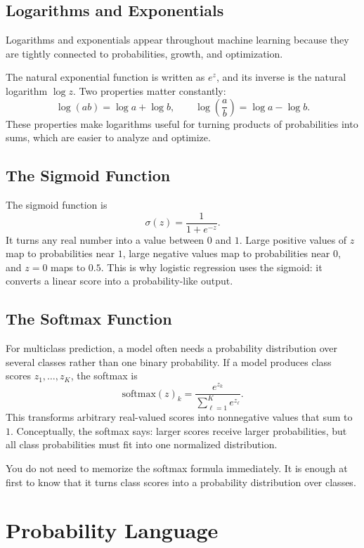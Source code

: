 \subsection{Logarithms and Exponentials}

Logarithms and exponentials appear throughout machine learning because they are tightly connected to probabilities, growth, and optimization.

The natural exponential function is written as $e^z$, and its inverse is the natural logarithm $\log z$. Two properties matter constantly:
\[
\log(ab) = \log a + \log b,
\qquad
\log\left(\frac{a}{b}\right) = \log a - \log b.
\]
These properties make logarithms useful for turning products of probabilities into sums, which are easier to analyze and optimize.

\subsection{The Sigmoid Function}

The sigmoid function is
\[
\sigma(z) = \frac{1}{1+e^{-z}}.
\]
It turns any real number into a value between $0$ and $1$. Large positive values of $z$ map to probabilities near $1$, large negative values map to probabilities near $0$, and $z=0$ maps to $0.5$. This is why logistic regression uses the sigmoid: it converts a linear score into a probability-like output.

\subsection{The Softmax Function}

For multiclass prediction, a model often needs a probability distribution over several classes rather than one binary probability. If a model produces class scores $z_1,\ldots,z_K$, the softmax is
\[
\mathrm{softmax}(z)_k = \frac{e^{z_k}}{\sum_{\ell=1}^{K} e^{z_\ell}}.
\]
This transforms arbitrary real-valued scores into nonnegative values that sum to $1$. Conceptually, the softmax says: larger scores receive larger probabilities, but all class probabilities must fit into one normalized distribution.

\begin{prereqbridge}
You do not need to memorize the softmax formula immediately. It is enough at first to know that it turns class scores into a probability distribution over classes.
\end{prereqbridge}

\section{Probability Language}

